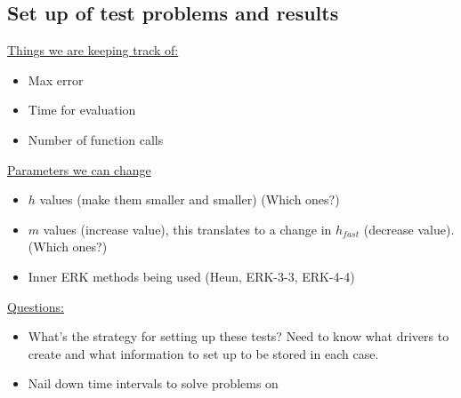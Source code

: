 \documentclass[12pt]{article}
\begin{document}
\subsection{Set up of test problems and results}
\underline{Things we are keeping track of:} 
\begin{itemize}
\item Max error
\item Time for evaluation
\item Number of function calls
\end{itemize}
\underline{Parameters we can change}
\begin{itemize}
\item $h$ values (make them smaller and smaller) (Which ones?)
\item $m$ values (increase value), this translates to a change in $h_{fast}$ (decrease value). (Which ones?) 
\item Inner ERK methods being used (Heun, ERK-3-3, ERK-4-4)
\end{itemize}

\underline{Questions:}
\begin{itemize}
\item What's the strategy for setting up these tests? Need to know what drivers to create and what information to set up to be stored in each case. 
\item Nail down time intervals to solve problems on
\end{itemize}
\end{document}
